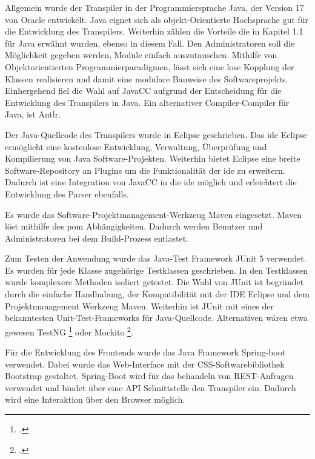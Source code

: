 Allgemein wurde der Transpiler in der Programmiersprache Java, der Version 17 von Oracle entwickelt. 
Java eignet sich  als objekt-Orientierte Hochsprache gut für die Entwicklung des Transpilers. 
Weiterhin zählen die Vorteile die in Kapitel 1.1 für Java erwähnt wurden, ebenso in diesem Fall. Den Administratoren soll die Möglichkeit gegeben werden, Module einfach auszutauschen. Mithilfe von Objektorientierten Programmierparadigmen, lässt sich eine lose Kopplung der Klassen realisieren und damit eine modulare Bauweise des Softwareprojekts.
Einhergehend fiel die Wahl auf JavaCC aufgrund der Entscheidung für die Entwicklung des Transpilers in Java. Ein alternativer Compiler-Compiler für Java, ist Antlr. 

Der Java-Quellcode des Transpilers wurde in Eclipse geschrieben. Das \ac{ide} Eclipse ermöglicht eine kostenlose Entwicklung, Verwaltung, Überprüfung und Kompilierung von Java Software-Projekten. Weiterhin bietet Eclipse eine breite Software-Repository an Plugins um die Funktionalität der  \ac{ide} zu erweitern. Dadurch ist eine Integration von JavaCC in die  \ac{ide} möglich und erleichtert die Entwicklung des Parser ebenfalls.

Es wurde das Software-Projektmanagement-Werkzeug Maven eingesetzt. Maven löst mithilfe des \ac{pom} Abhängigkeiten. 
Dadurch werden Benutzer und Administratoren bei dem Build-Prozess entlastet.

Zum Testen der Anwendung wurde das Java-Test Framework JUnit 5 verwendet. Es wurden für jede Klasse zugehörige Testklassen geschrieben. In den Testklassen wurde komplexere Methoden isoliert getestet.
Die Wahl von JUnit ist begründet durch die einfache Handhabung, der Kompatibilität mit der IDE Eclipse und dem Projektmanagement Werkzeug Maven. Weiterhin ist JUnit mit eines der bekanntesten Unit-Test-Frameworks für Java-Quellcode. Alternativen wären etwa gewesen TestNG \footcite[Vgl. ][]{testng} oder Mockito \footcite[Vgl. ][]{mockito}.

Für die Entwicklung des Frontends wurde das Java Framework Spring-boot verwendet.
Dabei wurde das Web-Interface mit der CSS-Softwarebibliothek Bootstrap gestaltet.
Spring-Boot wird für das behandeln von REST-Anfragen verwendet und bindet über eine API Schnittstelle den Transpiler ein.
Dadurch wird eine Interaktion über den Browser möglich.

